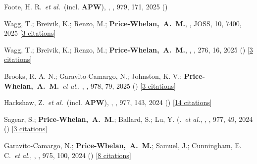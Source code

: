 \item[{\color{deemph}\scriptsize136}]Foote, H. R.~\textit{et al.}~(incl. \textbf{APW}), , \apj, 979, 171, 2025 ()

\item[{\color{deemph}\scriptsize135}]Wagg, T.; Breivik, K.; Renzo, M.; \textbf{Price-Whelan,~A.~M.}, , JOSS, 10, 7400, 2025 [\href{http://adsabs.harvard.edu/abs/2025JOSS...10.7400W}{3 citations}]

\item[{\color{deemph}\scriptsize134}]Wagg, T.; Breivik, K.; Renzo, M.; \textbf{Price-Whelan,~A.~M.}, , \apjs, 276, 16, 2025 () [\href{http://adsabs.harvard.edu/abs/2025ApJS..276...16W}{3 citations}]

\item[{\color{deemph}\scriptsize133}]Brooks, R. A. N.; Garavito-Camargo, N.; Johnston, K. V.; \textbf{Price-Whelan,~A.~M.}~\textit{et al.}, , \apj, 978, 79, 2025 () [\href{http://adsabs.harvard.edu/abs/2025ApJ...978...79B}{3 citations}]

\item[{\color{deemph}\scriptsize132}]Hackshaw, Z.~\textit{et al.}~(incl. \textbf{APW}), , \apj, 977, 143, 2024 () [\href{http://adsabs.harvard.edu/abs/2024ApJ...977..143H}{14 citations}]

\item[{\color{deemph}\scriptsize131}]Sagear, S.; \textbf{Price-Whelan,~A.~M.}; Ballard, S.; Lu, Y. (.~\textit{et al.}, , \apj, 977, 49, 2024 () [\href{http://adsabs.harvard.edu/abs/2024ApJ...977...49S}{3 citations}]

\item[{\color{deemph}\scriptsize130}]Garavito-Camargo, N.; \textbf{Price-Whelan,~A.~M.}; Samuel, J.; Cunningham, E. C.~\textit{et al.}, , \apj, 975, 100, 2024 () [\href{http://adsabs.harvard.edu/abs/2024ApJ...975..100G}{8 citations}]

